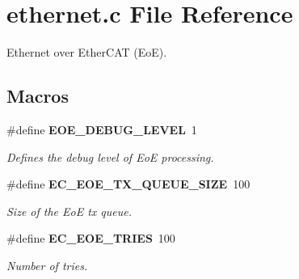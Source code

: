 \section{ethernet.\-c File Reference}
\label{ethernet_8c}


Ethernet over Ether\-C\-A\-T (Eo\-E).  


\subsection*{Macros}
\begin{DoxyCompactItemize}
\item 
\#define {\bf E\-O\-E\-\_\-\-D\-E\-B\-U\-G\-\_\-\-L\-E\-V\-E\-L}~1
\begin{DoxyCompactList}\small\item\em Defines the debug level of Eo\-E processing. \end{DoxyCompactList}\item 
\#define {\bf E\-C\-\_\-\-E\-O\-E\-\_\-\-T\-X\-\_\-\-Q\-U\-E\-U\-E\-\_\-\-S\-I\-Z\-E}~100\label{ethernet_8c_a70c1d2d995c7441a4f6e24aa46c08939}

\begin{DoxyCompactList}\small\item\em Size of the Eo\-E tx queue. \end{DoxyCompactList}\item 
\#define {\bf E\-C\-\_\-\-E\-O\-E\-\_\-\-T\-R\-I\-E\-S}~100\label{ethernet_8c_a0e63bd7f607fd32315eef69b1f66835f}

\begin{DoxyCompactList}\small\item\em Number of tries. \end{DoxyCompactList}\end{DoxyCompactItemize}
